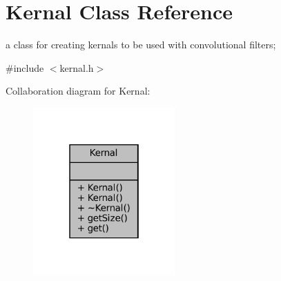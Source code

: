 \hypertarget{classKernal}{}\section{Kernal Class Reference}
\label{classKernal}


a class for creating kernals to be used with convolutional filters;  




{\ttfamily \#include $<$kernal.\+h$>$}



Collaboration diagram for Kernal\+:
\nopagebreak
\begin{figure}[H]
\begin{center}
\leavevmode
\includegraphics[width=154pt]{classKernal__coll__graph}
\end{center}
\end{figure}
